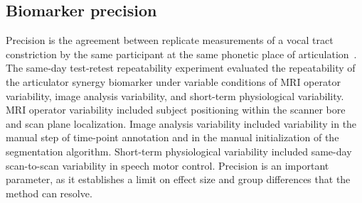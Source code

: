 \documentclass[preprint]{JASAnew}\usepackage[]{graphicx}\usepackage[]{color}
\begin{document}
\subsection{Biomarker precision}
\label{subsec:repeatability}

Precision is the agreement between replicate measurements of a vocal tract constriction by the same participant at the same phonetic place of articulation~\citep{kessler2015emerging,sullivan2015metrology}. 
%
The same-day test-retest repeatability experiment evaluated the repeatability of the articulator synergy biomarker under variable conditions of MRI operator variability, image analysis variability, and short-term physiological variability. 
%
MRI operator variability included subject positioning within the scanner bore and scan plane localization. 
%
Image analysis variability included variability in the manual step of time-point annotation and in the manual initialization of the segmentation algorithm. 
%
Short-term physiological variability included same-day scan-to-scan variability in speech motor control. 
%
Precision is an important parameter, as it establishes a limit on effect size and group differences that the method can resolve.
\end{document}
